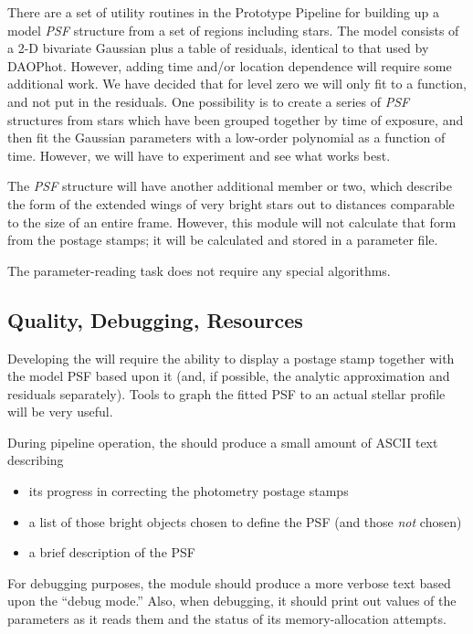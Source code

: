   There are a set of utility routines in the Prototype Pipeline
for building up a model {\it PSF} structure from a set of 
regions including stars.  The model consists of a 2-D bivariate
Gaussian plus a table of residuals, identical to that used
by DAOPhot.  However, adding time and/or location dependence
will require some additional work.  We have decided that for level
zero we will only fit to a function, and not put in the residuals.
One possibility is to create a series of {\it PSF} structures
from stars which have been grouped together by time of
exposure, and then fit the Gaussian parameters with a low-order
polynomial as a function of time.  However, we will have to
experiment and see what works best.

  The {\it PSF} structure will have another additional member or two,
which describe the form of the extended wings of very bright stars
out to distances comparable to the size of an entire frame.
However, this module will not calculate that form from the
postage stamps; it will be calculated and stored in a parameter
file.

  The parameter-reading task does not
require any special algorithms.

\subsection {Quality, Debugging, Resources}

  Developing the \fpsf will require the ability
to display a postage stamp together with the model PSF
based upon it (and, if possible, the analytic approximation
and residuals separately).  Tools to graph the fitted
PSF to an actual stellar profile will be very useful.

  During pipeline operation, the \fpsf should
produce a small amount of ASCII text describing 

\begin{itemize}
  \item its progress in correcting the photometry postage stamps
  \item a list of those bright objects chosen to define the PSF
        (and those {\it not} chosen)
  \item a brief description of the PSF
\end{itemize}

  For debugging purposes, the module should produce a more verbose
text based upon the ``debug mode.''  Also, when debugging, 
it should print out values of the parameters as it reads them 
and the status of its memory-allocation attempts.

